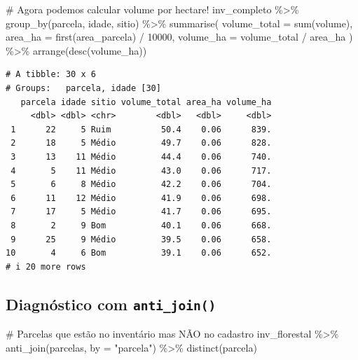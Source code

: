 \documentclass[
  letterpaper,
]{scrbook}
\newenvironment{Shaded}{\begin{snugshade}}{\end{snugshade}}
\newcommand{\AttributeTok}[1]{\textcolor[rgb]{0.40,0.45,0.13}{#1}}
\newcommand{\CommentTok}[1]{\textcolor[rgb]{0.37,0.37,0.37}{#1}}
\newcommand{\DecValTok}[1]{\textcolor[rgb]{0.68,0.00,0.00}{#1}}
\newcommand{\FunctionTok}[1]{\textcolor[rgb]{0.28,0.35,0.67}{#1}}
\newcommand{\NormalTok}[1]{\textcolor[rgb]{0.00,0.23,0.31}{#1}}
\newcommand{\SpecialCharTok}[1]{\textcolor[rgb]{0.37,0.37,0.37}{#1}}
\newcommand{\StringTok}[1]{\textcolor[rgb]{0.13,0.47,0.30}{#1}}
\begin{document}
\begin{Shaded}
\begin{Highlighting}[]
\CommentTok{\# Agora podemos calcular volume por hectare!}
\NormalTok{inv\_completo }\SpecialCharTok{\%\textgreater{}\%} 
  \FunctionTok{group\_by}\NormalTok{(parcela, idade, sitio) }\SpecialCharTok{\%\textgreater{}\%} 
  \FunctionTok{summarise}\NormalTok{(}
    \AttributeTok{volume\_total =} \FunctionTok{sum}\NormalTok{(volume),}
    \AttributeTok{area\_ha =} \FunctionTok{first}\NormalTok{(area\_parcela) }\SpecialCharTok{/} \DecValTok{10000}\NormalTok{,}
    \AttributeTok{volume\_ha =}\NormalTok{ volume\_total }\SpecialCharTok{/}\NormalTok{ area\_ha}
\NormalTok{  ) }\SpecialCharTok{\%\textgreater{}\%} 
  \FunctionTok{arrange}\NormalTok{(}\FunctionTok{desc}\NormalTok{(volume\_ha))}
\end{Highlighting}
\end{Shaded}

\begin{verbatim}
# A tibble: 30 x 6
# Groups:   parcela, idade [30]
   parcela idade sitio volume_total area_ha volume_ha
     <dbl> <dbl> <chr>        <dbl>   <dbl>     <dbl>
 1      22     5 Ruim          50.4    0.06      839.
 2      18     5 Médio         49.7    0.06      828.
 3      13    11 Médio         44.4    0.06      740.
 4       5    11 Médio         43.0    0.06      717.
 5       6     8 Médio         42.2    0.06      704.
 6      11    12 Médio         41.9    0.06      698.
 7      17     5 Médio         41.7    0.06      695.
 8       2     9 Bom           40.1    0.06      668.
 9      25     9 Médio         39.5    0.06      658.
10       4     6 Bom           39.1    0.06      652.
# i 20 more rows
\end{verbatim}

\subsection{\texorpdfstring{Diagnóstico com
\texttt{anti\_join()}}{Diagnóstico com anti\_join()}}\label{diagnuxf3stico-com-anti_join}

\begin{Shaded}
\begin{Highlighting}[]
\CommentTok{\# Parcelas que estão no inventário mas NÃO no cadastro}
\NormalTok{inv\_florestal }\SpecialCharTok{\%\textgreater{}\%} 
  \FunctionTok{anti\_join}\NormalTok{(parcelas, }\AttributeTok{by =} \StringTok{"parcela"}\NormalTok{) }\SpecialCharTok{\%\textgreater{}\%} 
  \FunctionTok{distinct}\NormalTok{(parcela)}
\end{Highlighting}
\end{Shaded}
\end{document}
